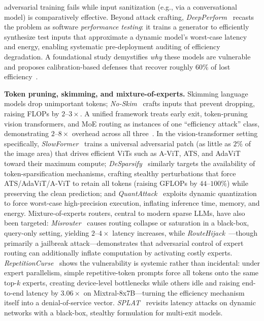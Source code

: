\documentclass[acmsmall,screen,review,nonacm]{acmart}
\begin{document}
adversarial training fails while input sanitization (e.g., via a conversational model) is comparatively effective. Beyond attack crafting, \emph{DeepPerform}~\cite{chen2022deepperform} recasts the problem as software \emph{performance testing}: it trains a generator to efficiently synthesize test inputs that approximate a dynamic model's worst-case latency and energy, enabling systematic pre-deployment auditing of efficiency degradation. A foundational study demystifies \emph{why} these models are vulnerable and proposes calibration-based defenses that recover roughly 60\% of lost efficiency~\cite{varma2024slowdown}.


\noindent\textbf{Token pruning, skimming, and mixture-of-experts.}
Skimming language models drop unimportant tokens; \emph{No-Skim}~\cite{zhang2023noskim} crafts inputs that prevent dropping, raising FLOPs by $2$--$3\times$. A unified framework treats early exit, token-pruning vision transformers, and MoE routing as instances of one ``efficiency attack'' class, demonstrating $2$--$8\times$ overhead across all three~\cite{rathnasuriya2025ddls}. In the vision-transformer setting specifically, \emph{SlowFormer}~\cite{navaneet2024slowformer} trains a universal adversarial patch (as little as $2\%$ of the image area) that drives efficient ViTs such as A-ViT, ATS, and AdaViT toward their maximum compute; \emph{DeSparsify}~\cite{yehezkel2024desparsify} similarly targets the availability of token-sparsification mechanisms, crafting stealthy perturbations that force ATS/AdaViT/A-ViT to retain all tokens (raising GFLOPs by $44$--$100\%$) while preserving the clean prediction; and \emph{QuantAttack}~\cite{baras2025quantattack} exploits dynamic quantization to force worst-case high-precision execution, inflating inference time, memory, and energy. Mixture-of-experts routers, central to modern sparse LLMs, have also been targeted: \emph{Misrouter}~\cite{fei2026misrouter} causes routing collapse or saturation in a black-box, query-only setting, yielding $2$--$4\times$ latency increases, while \emph{RouteHijack}~\cite{xu2026routehijack}---though primarily a jailbreak attack---demonstrates that adversarial control of expert routing can additionally inflate computation by activating costly experts. \emph{RepetitionCurse}~\cite{huang2025repetitioncurse} shows the vulnerability is systemic rather than incidental: under expert parallelism, simple repetitive-token prompts force all tokens onto the same top-$k$ experts, creating device-level bottlenecks while others idle and raising end-to-end latency by $3.06\times$ on Mixtral-8x7B---turning the efficiency mechanism itself into a denial-of-service vector. \emph{SPLAT}~\cite{li2026splat} revisits latency attacks on dynamic networks with a black-box, stealthy formulation for multi-exit models.
\end{document}
